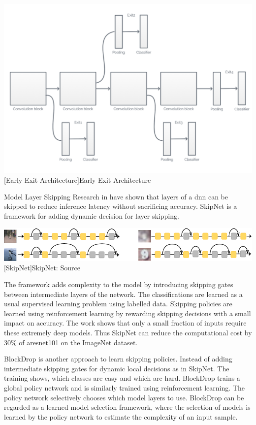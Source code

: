 \begin{enumdescript}
	\begin{minipage}[t]{\linewidth}    
		\centering                          
		\includegraphics[width=.7\linewidth]{figures/models/branchy}
		[Early Exit Architecture]{Early Exit Architecture}
		\label{fig:branchynet}
	\end{minipage}
	
	\item[Model Layer Skipping] Research in \cite{wang_skipnet:_2017, wu_blockdrop:_2017}  have shown that layers of a \gls{dnn} can be skipped to reduce inference latency without sacrificing accuracy. SkipNet \cite{wang_skipnet:_2017} is a framework for adding dynamic decision for layer skipping. 
	
	\begin{minipage}[t]{\linewidth}    
		\centering                          
		\includegraphics[width=.8\linewidth]{figures/models/skipnet}
		[SkipNet]{SkipNet: Source  \cite{wang_skipnet:_2017}}
	\end{minipage}
	
	The framework adds complexity to the model by introducing skipping gates between intermediate layers of the network. The classifications are learned as a usual supervised learning problem using labelled data. Skipping policies are learned using reinforcement learning by rewarding skipping decisions with a small impact on accuracy. The work shows that only a small fraction of inputs require these extremely deep models. Thus SkipNet can reduce the computational cost by 30\% of a\gls{resnet}101 on the ImageNet dataset. 
	
	BlockDrop \cite{wu_blockdrop:_2017} is another approach to learn skipping policies. Instead of adding intermediate skipping gates for dynamic local decisions as in SkipNet. The training shows, which classes are easy and which are hard. BlockDrop trains a global policy network and is similarly trained using reinforcement learning.  The policy network selectively chooses which model layers to use. BlockDrop can be regarded as a learned model selection framework, where the selection of models is learned by the policy network to estimate the complexity of an input sample. 
	

\end{enumdescript}
